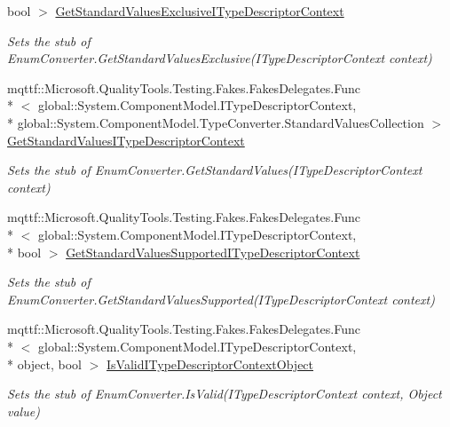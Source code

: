 \begin{DoxyCompactItemize}
bool $>$ \hyperlink{class_system_1_1_component_model_1_1_fakes_1_1_stub_enum_converter_a82ab6b9e75b7ffd16240934a3004eaaa}{Get\-Standard\-Values\-Exclusive\-I\-Type\-Descriptor\-Context}
\begin{DoxyCompactList}\small\item\em Sets the stub of Enum\-Converter.\-Get\-Standard\-Values\-Exclusive(\-I\-Type\-Descriptor\-Context context)\end{DoxyCompactList}\item 
mqttf\-::\-Microsoft.\-Quality\-Tools.\-Testing.\-Fakes.\-Fakes\-Delegates.\-Func\\*
$<$ global\-::\-System.\-Component\-Model.\-I\-Type\-Descriptor\-Context, \\*
global\-::\-System.\-Component\-Model.\-Type\-Converter.\-Standard\-Values\-Collection $>$ \hyperlink{class_system_1_1_component_model_1_1_fakes_1_1_stub_enum_converter_a18ee63d2427a28066a8b49f9a99e19cc}{Get\-Standard\-Values\-I\-Type\-Descriptor\-Context}
\begin{DoxyCompactList}\small\item\em Sets the stub of Enum\-Converter.\-Get\-Standard\-Values(\-I\-Type\-Descriptor\-Context context)\end{DoxyCompactList}\item 
mqttf\-::\-Microsoft.\-Quality\-Tools.\-Testing.\-Fakes.\-Fakes\-Delegates.\-Func\\*
$<$ global\-::\-System.\-Component\-Model.\-I\-Type\-Descriptor\-Context, \\*
bool $>$ \hyperlink{class_system_1_1_component_model_1_1_fakes_1_1_stub_enum_converter_a2d42dc6be0ee956689880c1083137e5e}{Get\-Standard\-Values\-Supported\-I\-Type\-Descriptor\-Context}
\begin{DoxyCompactList}\small\item\em Sets the stub of Enum\-Converter.\-Get\-Standard\-Values\-Supported(\-I\-Type\-Descriptor\-Context context)\end{DoxyCompactList}\item 
mqttf\-::\-Microsoft.\-Quality\-Tools.\-Testing.\-Fakes.\-Fakes\-Delegates.\-Func\\*
$<$ global\-::\-System.\-Component\-Model.\-I\-Type\-Descriptor\-Context, \\*
object, bool $>$ \hyperlink{class_system_1_1_component_model_1_1_fakes_1_1_stub_enum_converter_ad38f417d3029deeff0758980550c6e64}{Is\-Valid\-I\-Type\-Descriptor\-Context\-Object}
\begin{DoxyCompactList}\small\item\em Sets the stub of Enum\-Converter.\-Is\-Valid(\-I\-Type\-Descriptor\-Context context, Object value)\end{DoxyCompactList}\end{DoxyCompactItemize}
